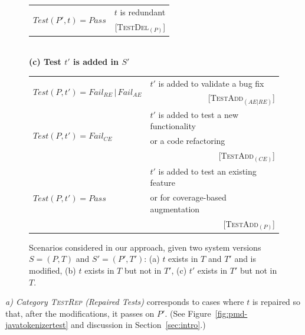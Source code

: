 \documentclass[conference]{IEEEtran}
\newcommand{\lang}[1]{\texttt{\small #1}}
\newcommand{\subject}[1]{\texttt{\small #1}}
\newcommand{\mt}{\mathit}
\newcommand{\pass}{\mt{Pass}}
\newcommand{\failce}{\mt{Fail}_{CE}}
\newcommand{\failre}{\mt{Fail}_{RE}}
\newcommand{\failae}{\mt{Fail}_{AE}}
\newcommand{\testfunc}[2]{\mt{Test(#1, #2)}}
\newcommand{\catrep}{\textsc{TestRep}}
\newcommand{\catdelp}{\textsc{TestDel}$_\mt{(P)}$}
\newcommand{\cataddaere}{\textsc{TestAdd}$_\mt{(AE|RE)}$}
\newcommand{\cataddce}{\textsc{TestAdd}$_\mt{(CE)}$}
\newcommand{\cataddp}{\textsc{TestAdd}$_\mt{(P)}$}
\begin{document}
\begin{figure}[t]
\begin{tabular}{|l||l|}
\hline
\multirow{2}{*}{$\testfunc{P'}{t} = \pass$} & $t$ is redundant \\
& \multicolumn{1}{r|}{\scriptsize [\catdelp{}]} \\
\hline 
\end{tabular}
\\ [8pt]
%
\textbf{(c) Test $t'$ is added in $S'$}
\\ [2pt]
\begin{tabular}{|l||l|}
  \hline
  \multirow{2}{*}{$\testfunc{P}{t'} = \failre \, | \, \failae$} &
  $t'$ is added to validate a bug fix \\
  & \multicolumn{1}{r|}{\scriptsize [\cataddaere{}]} \\
  \hline
  \multirow{3}{*}{$\testfunc{P}{t'} = \failce$} &
  $t'$ is added to test a new functionality \\
  & or a code refactoring \\
  & \multicolumn{1}{r|}{\scriptsize [\cataddce{}]} \\
  \hline
  \multirow{3}{*}{$\testfunc{P}{t'} = \pass$} &
  $t'$ is added to test an existing feature\\
  & or for coverage-based augmentation \\
  & \multicolumn{1}{r|}{\scriptsize [\cataddp{}]} \\
  \hline
\end{tabular}
\caption{Scenarios considered in our approach, given two system
  versions $S = (P, T)$ and $S' = (P', T')$: (a) $t$ exists in $T$ and
  $T'$ and is modified, (b) $t$ exists in $T$ but not in $T'$, (c)
  $t'$ exists in $T'$ but not in $T$.}
\vspace*{-12pt}
\label{fig:study-design}
\end{figure}

\textit{a) Category \catrep{} (Repaired Tests)} corresponds to cases
where $t$ is repaired so that, after the modifications, it passes on
$P'.$ (See Figure~\ref{fig:pmd-javatokenizertest} and discussion in
Section~\ref{sec:intro}.)

\end{document}
